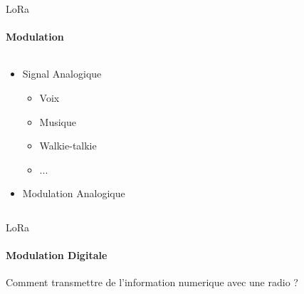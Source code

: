 \begin{frame}{LoRa}
\framesubtitle{Modulation}
\begin{columns}
\begin{column}{0.5\textwidth}
\begin{itemize}
  \item Signal Analogique
  \begin{itemize}
    \item Voix
    \item Musique
    \item Walkie-talkie
    \item ...
  \end{itemize}
  \item Modulation Analogique
  \begin{itemize}
  \end{itemize}
\end{itemize}  
\end{column}
\begin{column}{0.5\textwidth}

\end{column}
\end{columns}


\end{frame}

\begin{frame}{LoRa}
\framesubtitle{Modulation Digitale}

\begin{block}{}
{
Comment transmettre de l'information numerique avec une radio ?
}
\end{block}
\vspace{0.5cm}
\end{frame}

